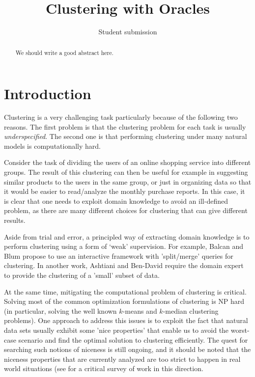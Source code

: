 \documentclass[orivec]{llncs}
\title{Clustering with Oracles}
\author{Student submission}
\begin{document}
\maketitle

\begin{abstract}
We should write a good abstract here.
\end{abstract}

\section{Introduction}

Clustering is a very challenging task particularly because of the following two reasons. The first problem is that the clustering problem for each task is usually \emph{underspecified}. The second one is that performing clustering under many natural models is computationally hard.

Consider the task of dividing the users of an online shopping service into different groups. The result of this clustering can then be useful for example in suggesting similar products to the users in the same group, or just in organizing data so that it would be easier to read/analyze the monthly purchase reports. In this case, it is clear that one needs to exploit domain knowledge to avoid an ill-defined problem, as there are many different choices for clustering that can give different results. 

Aside from trial and error, a principled way of extracting domain knowledge is to perform clustering using a form of `weak' supervision.  For example, Balcan and Blum \cite{balcan2008clustering} propose to use an interactive framework with 'split/merge' queries for clustering. In another work, Ashtiani and Ben-David \cite{ashtiani2015representation} require the domain expert to provide the clustering of a 'small' subset of data.

At the same time, mitigating the computational problem of clustering is critical. Solving most of the common optimization formulations of clustering is NP hard (in particular, solving the well known $k$-means and $k$-median clustering problems). One approach to address this issues is to exploit the fact that natural data sets usually exhibit some 'nice properties' that enable us to avoid the worst-case scenario and find the optimal solution to clustering efficiently. The quest for searching such notions of niceness is still ongoing, and it should be noted that the niceness properties that are currently analyzed are too strict to happen in real world situations (see \cite{Ben-David15} for a critical survey of work in this direction.
\end{document}

